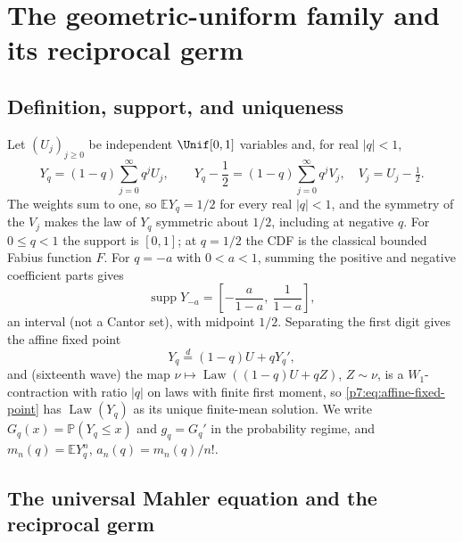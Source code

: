 \documentclass[11pt,oneside]{article}
\numberwithin{equation}{section}
\theoremstyle{definition}
\theoremstyle{remark}
\newcommand{\E}{\mathbb E}
\newcommand{\Prob}{\mathbb P}
\newcommand{\Law}{\operatorname{Law}}
\newcommand{\supp}{\operatorname{supp}}
\begin{document}
\section{The geometric-uniform family and its reciprocal germ}
\label{p7:sec:germ}

\subsection{Definition, support, and uniqueness}

Let $(U_j)_{j\ge0}$ be independent $\Unif[0,1]$ variables and, for real
$|q|<1$,
\begin{equation}\label{p7:eq:Yq}
 Y_q=(1-q)\sum_{j=0}^{\infty}q^jU_j,
 \qquad
 Y_q-\frac12=(1-q)\sum_{j=0}^{\infty}q^jV_j,
 \quad V_j=U_j-\tfrac12.
\end{equation}
The weights sum to one, so $\E Y_q=1/2$ for every real $|q|<1$, and the
symmetry of the $V_j$ makes the law of $Y_q$ symmetric about $1/2$, including
at negative $q$.  For $0\le q<1$ the support is $[0,1]$; at $q=1/2$ the CDF is
the classical bounded Fabius function $F$.  For $q=-a$ with $0<a<1$, summing
the positive and negative coefficient parts gives
\begin{equation}\label{p7:eq:negative-support}
 \supp Y_{-a}=\left[-\frac a{1-a},\ \frac1{1-a}\right],
\end{equation}
an interval (not a Cantor set), with midpoint $1/2$.  Separating the first
digit gives the affine fixed point
\begin{equation}\label{p7:eq:affine-fixed-point}
 Y_q\overset d=(1-q)U+qY_q',
\end{equation}
and (sixteenth wave) the map
$\nu\mapsto\Law((1-q)U+qZ)$, $Z\sim\nu$, is a $W_1$-contraction with ratio
$|q|$ on laws with finite first moment, so \eqref{p7:eq:affine-fixed-point}
has $\Law(Y_q)$ as its unique finite-mean solution.  We write
$G_q(x)=\Prob(Y_q\le x)$ and $g_q=G_q'$ in the probability regime, and
$m_n(q)=\E Y_q^n$, $a_n(q)=m_n(q)/n!$.

\subsection{The universal Mahler equation and the reciprocal germ}
\end{document}
